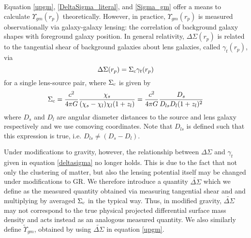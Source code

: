 \documentclass[onecolumn,amsmath,aps,fleqn, superscriptaddress]{revtex4}
\begin{document}
Equation \ref{upgm}, \ref{DeltaSigma_literal}, and \ref{Sigma_gm} offer a means to calculate $\Upsilon_{gm}(r_p)$ theoretically. However, in practice, $\Upsilon_{gm}(r_p)$ is measured observationally via galaxy-galaxy lensing: the correlation of background galaxy shapes with foreground galaxy position. In general relativity, $\Delta \Sigma(r_p)$ is related to the tangential shear of background galaxies about lens galaxies, called $\gamma_t(r_p)$, via
\begin{equation}
\Delta \Sigma(r_p) = \Sigma_{\rm c} \gamma_t(r_p)
\label{deltasigma}
\end{equation}
for a single lens-source pair, where $\Sigma_{\rm c}$ is given by
\begin{align}
\Sigma_{\rm c} = \frac{c^2}{4\pi G} \frac{\chi_s}{(\chi_s - \chi_l)\chi_l (1+z_l)} =  \frac{c^2}{4\pi G} \frac{D_s}{D_{ls} D_l (1+z_l)^2}
\label{sigmac}
\end{align}
where $D_s$ and $D_l$ are angular diameter distances to the source and lens galaxy respectively and we use comoving coordinates. Note that $D_{ls}$ is defined such that this expression is true, i.e. $D_{ls} \ne (D_s - D_l)$.

Under modifications to gravity, however, the relationship between $\Delta \Sigma$ and $\gamma_t$ given in equation \ref{deltasigma} no longer holds. This is due to the fact that not only the clustering of matter, but also the lensing potential itself may be changed under modifications to GR. We therefore introduce a quantity $\widetilde{\Delta \Sigma}$ which we define as the measured quantity obtained via measuring tangential shear and and multiplying by averaged $\Sigma_{\rm c}$ in the typical way. Thus, in modified gravity, $\widetilde{\Delta \Sigma}$ may not correspond to the true physical projected differential surface mass density and acts instead as an analogous measured quantity. We also similarly define $\tilde{\Upsilon}_{gm}$, obtained by using $\widetilde{\Delta \Sigma}$ in equation \ref{upgm}. 
\end{document}
